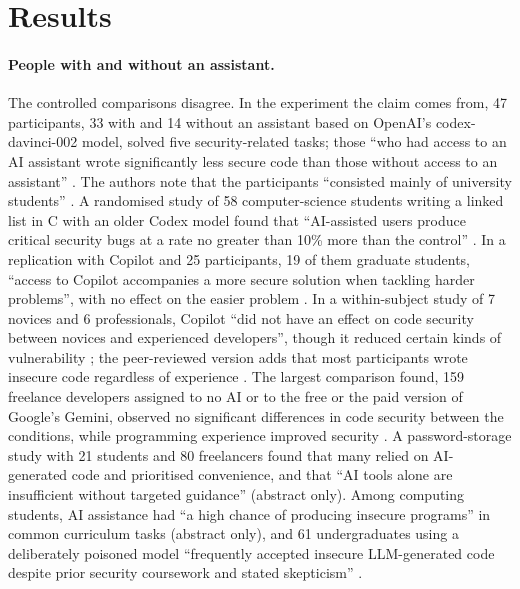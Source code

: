 \section{Results}
\label{insecure-code:results}

\paragraph{People with and without an assistant.}
The controlled comparisons disagree.
In the experiment the claim comes from, 47 participants, 33 with and 14
without an assistant based on OpenAI's codex-davinci-002 model, solved five
security-related tasks; those \enquote{who had access to an AI assistant
wrote significantly less secure code than those without access to an
assistant} \autocite[abstract]{Perry2023Users}.
The authors note that the participants \enquote{consisted mainly of
university students} \autocite[sect.~7.2]{Perry2023Users}.
A randomised study of 58 computer-science students writing a linked list in
C with an older Codex model found that \enquote{AI-assisted users produce
critical security bugs at a rate no greater than 10\% more than the
control} \autocite[abstract]{Sandoval2023LostC}.
In a replication with Copilot and 25 participants, 19 of them graduate
students, \enquote{access to Copilot accompanies a more secure solution when
tackling harder problems}, with no effect on the easier problem
\autocite[abstract]{Asare2024UserCentered}.
In a within-subject study of 7 novices and 6 professionals, Copilot
\enquote{did not have an effect on code security between novices and
experienced developers}, though it reduced certain kinds of vulnerability
\autocite[abstract]{ZareShahneh2025Copilot}; the peer-reviewed version adds
that most participants wrote insecure code regardless of experience
\autocite{ZareAssal2026Copilot}.
The largest comparison found, 159 freelance developers assigned to no AI or
to the free or the paid version of Google's Gemini, observed no significant
differences in code security between the conditions, while programming
experience improved security \autocite[abstract]{Jost2026Gemini}.
A password-storage study with 21 students and 80 freelancers found that many
relied on AI-generated code and prioritised convenience, and that
\enquote{AI tools alone are insufficient without targeted guidance}
\autocite{Yardim2026Password} (abstract only).
Among computing students, AI assistance had \enquote{a high chance of
producing insecure programs} in common curriculum tasks
\autocite{Yuan2025Mindset} (abstract only), and 61 undergraduates using a
deliberately poisoned model \enquote{frequently accepted insecure
LLM-generated code despite prior security coursework and stated skepticism}
\autocite[abstract]{Park2025Aware}.

